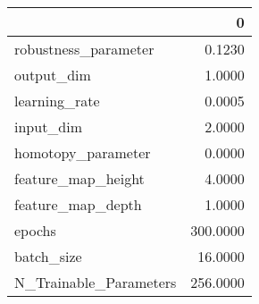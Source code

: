 \begin{tabular}{lr}
\toprule
{} &         0 \\
\midrule
robustness\_parameter   &    0.1230 \\
output\_dim             &    1.0000 \\
learning\_rate          &    0.0005 \\
input\_dim              &    2.0000 \\
homotopy\_parameter     &    0.0000 \\
feature\_map\_height     &    4.0000 \\
feature\_map\_depth      &    1.0000 \\
epochs                 &  300.0000 \\
batch\_size             &   16.0000 \\
N\_Trainable\_Parameters &  256.0000 \\
\bottomrule
\end{tabular}
